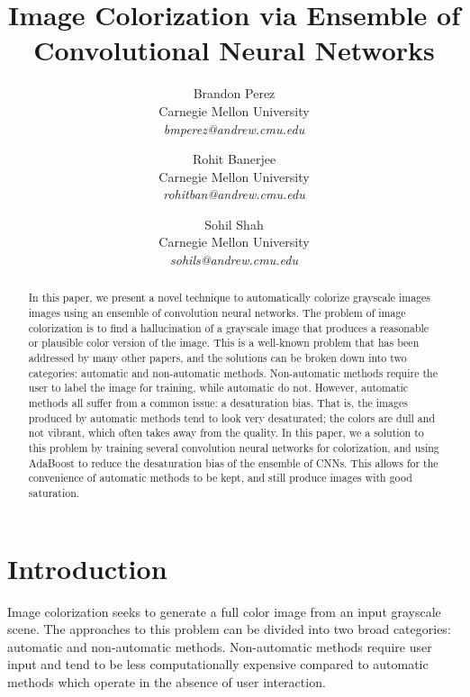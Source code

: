 \documentclass[10pt,twocolumn,letterpaper]{article}
\begin{document}
\title{Image Colorization via Ensemble of Convolutional Neural Networks}

\author{
    Brandon Perez \\
    Carnegie Mellon University \\
    \textit{\small bmperez@andrew.cmu.edu} \\
    \and
    Rohit Banerjee \\
    Carnegie Mellon University \\
    \textit{\small rohitban@andrew.cmu.edu} \\
    \and
    Sohil Shah \\
    Carnegie Mellon University \\
    \textit{\small sohils@andrew.cmu.edu} \\
}

\maketitle


\begin{abstract}
    In this paper, we present a novel technique to automatically colorize grayscale images images using an ensemble of convolution neural networks. The problem of image colorization is to find a hallucination of a grayscale image that produces a reasonable or plausible color version of the image. This is a well-known problem that has been addressed by many other papers, and the solutions can be broken down into two categories: automatic and non-automatic methods. Non-automatic methods require the user to label the image for training, while automatic do not. However, automatic methods all suffer from a common issue: a desaturation bias. That is, the images produced by automatic methods tend to look very desaturated; the colors are dull and not vibrant, which often takes away from the quality. In this paper, we a solution to this problem by training several convolution neural networks for colorization, and using AdaBoost to reduce the desaturation bias of the ensemble of CNNs. This allows for the convenience of automatic methods to be kept, and still produce images with good saturation.
\end{abstract}

\section{Introduction}
Image colorization seeks to generate a full color image from an input grayscale scene. The approaches to this problem can be divided into two broad categories: automatic and non-automatic methods. Non-automatic methods require user input and tend to be less computationally expensive compared to automatic methods which operate in the absence of user interaction.
\end{document}

